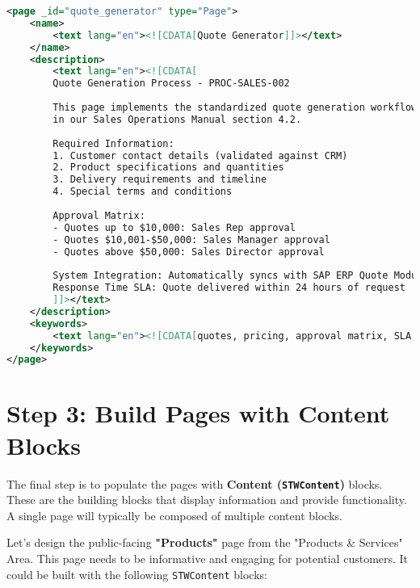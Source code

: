 \begin{lstlisting}[language=XML,caption={Page with Process Documentation},label={lst:page-docs}]
<page _id="quote_generator" type="Page">
    <name>
        <text lang="en"><![CDATA[Quote Generator]]></text>
    </name>
    <description>
        <text lang="en"><![CDATA[
        Quote Generation Process - PROC-SALES-002
        
        This page implements the standardized quote generation workflow as defined 
        in our Sales Operations Manual section 4.2.
        
        Required Information:
        1. Customer contact details (validated against CRM)
        2. Product specifications and quantities
        3. Delivery requirements and timeline
        4. Special terms and conditions
        
        Approval Matrix:
        - Quotes up to $10,000: Sales Rep approval
        - Quotes $10,001-$50,000: Sales Manager approval
        - Quotes above $50,000: Sales Director approval
        
        System Integration: Automatically syncs with SAP ERP Quote Module
        Response Time SLA: Quote delivered within 24 hours of request
        ]]></text>
    </description>
    <keywords>
        <text lang="en"><![CDATA[quotes, pricing, approval matrix, SLA, SAP integration, sales process]]></text>
    </keywords>
</page>
\end{lstlisting}

\section{Step 3: Build Pages with Content Blocks}
\label{sec:build-with-content}

The final step is to populate the pages with \textbf{Content (\texttt{STWContent})} blocks. These are the building blocks that display information and provide functionality. A single page will typically be composed of multiple content blocks.

Let's design the public-facing \textbf{"Products"} page from the "Products \& Services" Area. This page needs to be informative and engaging for potential customers. It could be built with the following \texttt{STWContent} blocks:

